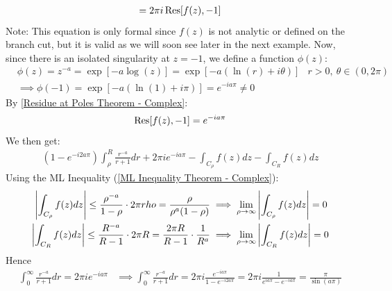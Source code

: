 \documentclass[12pt, english]{book}
\makeatletter
\renewenvironment{proof}[1][\proofname]{\par
	\pushQED{\qed}%
	\normalfont \topsep6\p@\@plus6\p@\relax
	\list{}{%
		\settowidth{\leftmargin}{\itshape\proofname:\hskip\labelsep}%
		\setlength{\labelwidth}{0pt}%
		\setlength{\itemindent}{-\leftmargin}%
		}%
	\item[\hskip\labelsep\itshape#1\@addpunct{:}]\ignorespaces
	}{\popQED\endlist\@endpefalse}
\makeatother
\begin{document}
\begin{example}
\begin{proof}
\begin{align*}
				= 2\pi i \Res[f(z), -1]
			\end{align*}
			Note: This equation is only formal since \(f(z)\) is not analytic or defined on the branch cut, but it is valid as we will soon see later in the next example.
			Now, since there is an isolated singularity at \(z=-1\), we define a function \(\phi(z)\):
			\begin{align*}
				&\phi(z) = z^{-a} = \exp[-a\log(z)] = \exp[-a(\ln(r) + i \theta)]
					& r>0, \ \theta \in (0, 2\pi) \\
				&\implies \phi(-1) = \exp[-a(\ln(1) + i\pi)] = e^{-ia\pi} \neq 0
			\end{align*}
			By \cref{Residue at Poles Theorem - Complex}:
			\begin{align*}
				\Res[f(z), -1] = e^{-ia\pi}
			\end{align*}
			We then get:
			\begin{align*}
				(1-e^{-i2a\pi}) \int_{\rho}^{R} \frac{r^{-a}}{r+1} dr + 2\pi i e^{-ia\pi}
					- \int_{C_\rho} f(z) dz - \int_{C_R} f(z) dz
			\end{align*}
		 	Using the ML Inequality (\cref{ML Inequality Theorem - Complex}):
		 	\begin{align*}
		 		\abs{\int_{C_\rho} f(z) dz} 
		 		\leq \frac{\rho^{-a}}{1-\rho} \cdot 2\pi rho = \frac{\rho}{\rho^a(1-\rho)}
		 		&\implies \lim_{\rho \rightarrow \infty} \abs{\int_{C_\rho} f(z) dz}  = 0 \\
		 		\abs{\int_{C_R} f(z) dz} 
		 		\leq \frac{R^{-a}}{R-1} \cdot 2\pi R = \frac{2\pi R}{R-1} \cdot \frac{1}{R^a}
		 		&\implies \lim_{\rho \rightarrow \infty} \abs{\int_{C_R} f(z) dz}  = 0 
		 	\end{align*}
	 		Hence
	 		\begin{align*}
	 			\int_{0}^{\infty} \frac{r^{-a}}{r+1} dr = 2\pi i e^{-ia\pi}
	 			&\implies \int_{0}^{\infty} \frac{r^{-a}}{r+1} dr 
	 				= 2\pi i \frac{e^{-ia\pi}}{1-e^{-i2a\pi}} 
	 				= 2\pi i \frac{1}{e^{ia\pi} - e^{-ia\pi}}
	 				= \frac{\pi}{\sin(a\pi)}
	 		\end{align*}
		\end{proof}
	\end{example}
\end{document}
